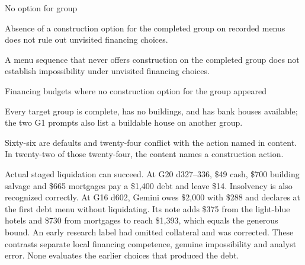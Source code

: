 
No option for group

Absence of a construction option for the completed group on recorded menus does not rule out unvisited financing choices.

A menu sequence that never offers construction on the completed group does not establish impossibility under unvisited financing choices.

Financing budgets where no construction option for the group appeared

Every target group is complete, has no buildings, and has bank houses available; the two G1 prompts also list a buildable house on another group.


Sixty-six are defaults and twenty-four conflict with the action named in content. In twenty-two of those twenty-four, the content names a construction action.


Actual staged liquidation can succeed. At G20 d327--336, \$49 cash, \$700 building salvage and \$665 mortgages pay a \$1,400 debt and leave \$14. Insolvency is also recognized correctly. At G16 d602, Gemini owes \$2,000 with \$288 and declares at the first debt menu without liquidating. Its note adds \$375 from the light-blue hotels and \$730 from mortgages to reach \$1,393, which equals the generous bound. An early research label had omitted collateral and was corrected. These contrasts separate local financing competence, genuine impossibility and analyst error. None evaluates the earlier choices that produced the debt.

